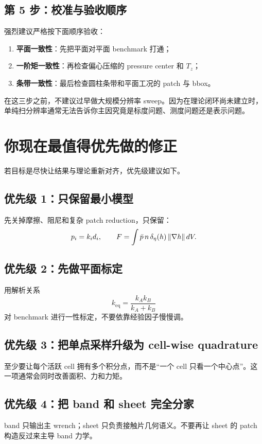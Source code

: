 \documentclass[12pt,a4paper]{ctexart}
\begin{document}
\subsection{第 5 步：校准与验收顺序}
强烈建议严格按下面顺序验收：
\begin{enumerate}
    \item \textbf{平面一致性}：先把平面对平面 benchmark 打通；
    \item \textbf{一阶矩一致性}：再检查偏心压缩的 pressure center 和 $T_z$；
    \item \textbf{条带一致性}：最后检查圆柱条带和平面工况的 patch 与 bbox。
\end{enumerate}

在这三步之前，不建议过早做大规模分辨率 sweep。因为在理论闭环尚未建立时，单纯扫分辨率通常无法告诉你主因究竟是标度问题、测度问题还是表示问题。

\section{你现在最值得优先做的修正}

若目标是尽快让结果与理论重新对齐，优先级建议如下。

\subsection{优先级 1：只保留最小模型}
先关掉摩擦、阻尼和复杂 patch reduction，只保留：
\begin{equation}
    p_i=k_i d_i,
    \qquad
    F = \int \bar p\,n\,\delta_\eta(h)\,\norm{\nabla h}\,dV.
\end{equation}

\subsection{优先级 2：先做平面标定}
用解析关系
\begin{equation}
    k_{\mathrm{eq}}=\frac{k_Ak_B}{k_A+k_B}
\end{equation}
对 benchmark 进行一性标定，不要依靠经验因子慢慢调。

\subsection{优先级 3：把单点采样升级为 cell-wise quadrature}
至少要让每个活跃 cell 拥有多个积分点，而不是“一个 cell 只看一个中心点”。这一项通常会同时改善面积、力和力矩。

\subsection{优先级 4：把 band 和 sheet 完全分家}
band 只输出主 wrench；sheet 只负责接触片几何语义。不要再让 sheet 的 patch 构造反过来主导 band 力学。
\end{document}
